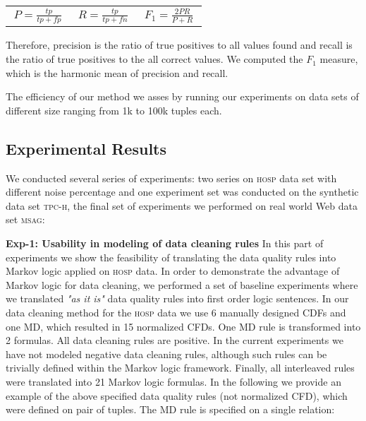 \begin{tabular}{ l l l }
$~P=\frac{tp}{tp+fp}~$ & $~R=\frac{tp}{tp+fn}~$ & $~F_1=\frac{2PR}{P+R}~$ \\
\end{tabular}

Therefore, precision is the ratio of true positives to all values found and recall is the ratio of true positives to the all correct values. We computed the $F_1$ measure, which is the harmonic mean of precision and recall.

The efficiency of our method we asses by running our experiments on data sets of different size ranging from 1k to 100k tuples each.

\subsection{Experimental Results} 


We conducted several series of experiments:  two series on \textsc{hosp} data set with different noise percentage and one experiment set was conducted on the synthetic data set \textsc{tpc-h}, the final set of experiments we performed on real world Web data set \textsc{msag}: 


\textbf{Exp-1: Usability in modeling of data cleaning rules} In this part of experiments we show the feasibility of translating the data quality rules into Markov logic applied on \textsc{hosp} data. In order to demonstrate the advantage of Markov logic for data cleaning, we performed a set of baseline experiments where we translated \textit{"as it is"} data quality rules into first order logic sentences. In our data cleaning method for the \textsc{hosp} data we use 6 manually designed CDFs and one MD, which resulted in 15 normalized CFDs. One MD rule is transformed into 2 formulas. All data cleaning rules are positive. In the current experiments we have not modeled negative data cleaning rules, although such rules can be trivially defined within the Markov logic framework. Finally, all interleaved rules were translated into 21 Markov logic formulas. In the following we provide an example of the above specified data quality rules (not normalized CFD), which were defined on pair of tuples. The MD rule is specified on a single relation:

